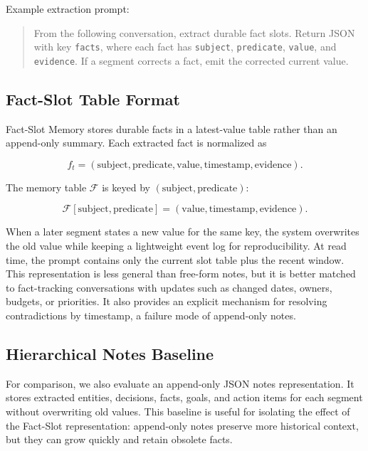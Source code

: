 \documentclass[conference]{IEEEtran}
\begin{document}
Example extraction prompt:
\begin{quote}
From the following conversation, extract durable fact slots. Return JSON with key \texttt{facts}, where each fact has \texttt{subject}, \texttt{predicate}, \texttt{value}, and \texttt{evidence}. If a segment corrects a fact, emit the corrected current value.
\end{quote}

\subsection{Fact-Slot Table Format}
\label{sec:slot-format}

Fact-Slot Memory stores durable facts in a latest-value table rather than an append-only summary. Each extracted fact is normalized as

\begin{equation}
f_t = (\text{subject}, \text{predicate}, \text{value}, \text{timestamp}, \text{evidence}).
\end{equation}

The memory table $\mathcal{F}$ is keyed by $(\text{subject}, \text{predicate})$:

\begin{equation}
\mathcal{F}[\text{subject}, \text{predicate}] = (\text{value}, \text{timestamp}, \text{evidence}).
\end{equation}

When a later segment states a new value for the same key, the system overwrites the old value while keeping a lightweight event log for reproducibility. At read time, the prompt contains only the current slot table plus the recent window. This representation is less general than free-form notes, but it is better matched to fact-tracking conversations with updates such as changed dates, owners, budgets, or priorities. It also provides an explicit mechanism for resolving contradictions by timestamp, a failure mode of append-only notes.

\subsection{Hierarchical Notes Baseline}
\label{sec:notes-format}

For comparison, we also evaluate an append-only JSON notes representation. It stores extracted entities, decisions, facts, goals, and action items for each segment without overwriting old values. This baseline is useful for isolating the effect of the Fact-Slot representation: append-only notes preserve more historical context, but they can grow quickly and retain obsolete facts.
\end{document}
